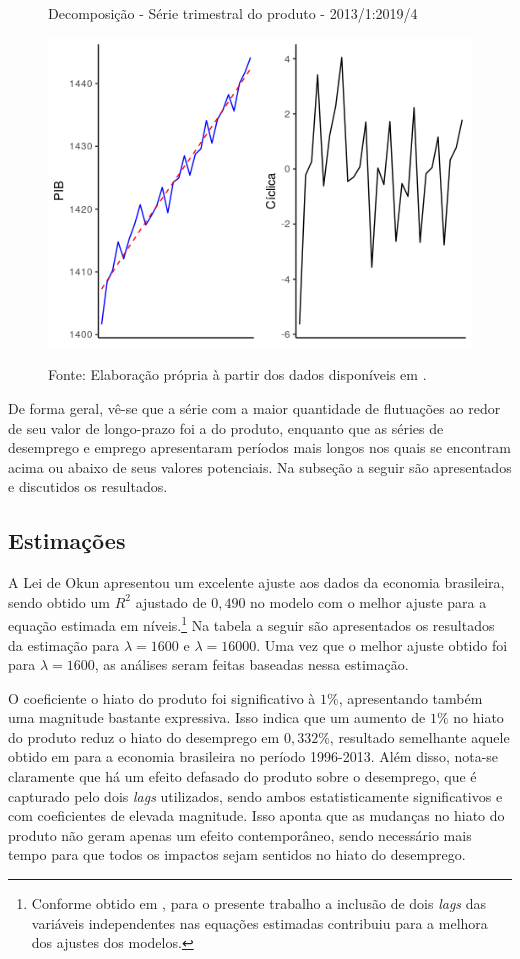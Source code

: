 \documentclass[12pt, openright,oneside, a4paper, english, brazil, section = TITLE, ubsection = Title]{article}
\begin{document}
\begin{figure}[H]
	\centering
	\caption{Decomposição - Série trimestral do produto - 2013/1:2019/4}
	\label{fig:decomposição_PIB}
	\includegraphics[width=0.45\linewidth]{"Figuras/decomposição_produto.png"} \\
\caption*{Fonte: Elaboração própria à partir dos dados disponíveis em \cite{IPEA2020}.}
\end{figure}

De forma geral, vê-se que a série com a maior quantidade de flutuações ao redor de seu valor de longo-prazo foi a do produto, enquanto que as séries de desemprego e emprego apresentaram períodos mais longos nos quais se encontram acima ou abaixo de seus valores potenciais. Na subseção a seguir são apresentados e discutidos os resultados.

\subsection{Estimações}

A Lei de Okun apresentou um excelente ajuste aos dados da economia brasileira, sendo obtido um $R^2$ ajustado de $0,490$ no modelo com o melhor ajuste para a equação estimada em níveis.\footnote{Conforme obtido em , para o presente trabalho a inclusão de dois \textit{lags} das variáveis independentes nas equações estimadas contribuiu para a melhora dos ajustes dos modelos.} Na tabela a seguir são apresentados os resultados da estimação para $\lambda = 1600$ e $\lambda = 16000$. Uma vez que o melhor ajuste obtido foi para $\lambda = 1600$, as análises seram feitas baseadas nessa estimação.

O coeficiente o hiato do produto foi significativo à $1\%$, apresentando também uma magnitude bastante expressiva. Isso indica que um aumento de $1\%$ no hiato do produto reduz o hiato do desemprego em $0,332\%$, resultado semelhante aquele obtido em  para a economia brasileira no período 1996-2013. Além disso, nota-se claramente que há um efeito defasado do produto sobre o desemprego, que é capturado pelo dois \textit{lags} utilizados, sendo ambos estatisticamente significativos e com coeficientes de elevada magnitude. Isso aponta que as mudanças no hiato do produto não geram apenas um efeito contemporâneo, sendo necessário mais tempo para que todos os impactos sejam sentidos no hiato do desemprego.
\end{document}
